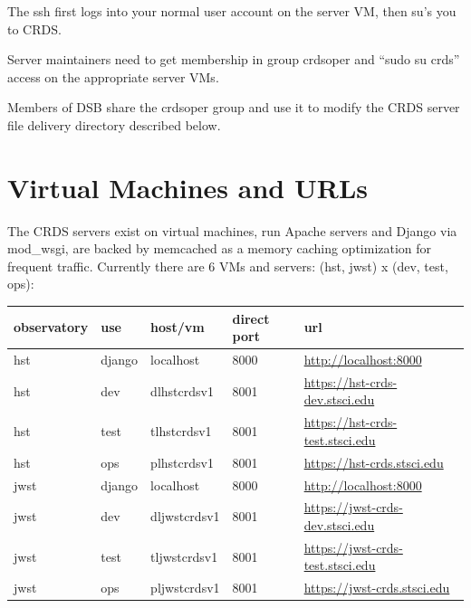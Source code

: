 \documentclass[letterpaper,10pt,english]{sphinxmanual}
\begin{document}
The ssh first logs into your normal user account on the server VM, then su's you to CRDS.

Server maintainers need to get membership in group crdsoper and ``sudo su crds'' access on
the appropriate server VMs.

Members of DSB share the crdsoper group and use it to modify the CRDS server file delivery
directory described below.


\section{Virtual Machines and URLs}
\label{server_guide:virtual-machines-and-urls}
The CRDS servers exist on virtual machines,  run Apache servers and Django via mod\_wsgi,
are backed by memcached as a memory caching optimization for frequent traffic.  Currently
there are 6 VMs and servers:  (hst, jwst) x (dev, test, ops):

\begin{tabulary}{\linewidth}{|L|L|L|L|L|}
\hline
\textbf{
observatory
} & \textbf{
use
} & \textbf{
host/vm
} & \textbf{
direct port
} & \textbf{
url
}\\\hline

hst
 & 
django
 & 
localhost
 & 
8000
 & 
\href{http://localhost:8000}{http://localhost:8000}
\\\hline

hst
 & 
dev
 & 
dlhstcrdsv1
 & 
8001
 & 
\href{https://hst-crds-dev.stsci.edu}{https://hst-crds-dev.stsci.edu}
\\\hline

hst
 & 
test
 & 
tlhstcrdsv1
 & 
8001
 & 
\href{https://hst-crds-test.stsci.edu}{https://hst-crds-test.stsci.edu}
\\\hline

hst
 & 
ops
 & 
plhstcrdsv1
 & 
8001
 & 
\href{https://hst-crds.stsci.edu}{https://hst-crds.stsci.edu}
\\\hline

jwst
 & 
django
 & 
localhost
 & 
8000
 & 
\href{http://localhost:8000}{http://localhost:8000}
\\\hline

jwst
 & 
dev
 & 
dljwstcrdsv1
 & 
8001
 & 
\href{https://jwst-crds-dev.stsci.edu}{https://jwst-crds-dev.stsci.edu}
\\\hline

jwst
 & 
test
 & 
tljwstcrdsv1
 & 
8001
 & 
\href{https://jwst-crds-test.stsci.edu}{https://jwst-crds-test.stsci.edu}
\\\hline

jwst
 & 
ops
 & 
pljwstcrdsv1
 & 
8001
 & 
\href{https://jwst-crds.stsci.edu}{https://jwst-crds.stsci.edu}
\\\hline
\end{tabulary}
\end{document}
